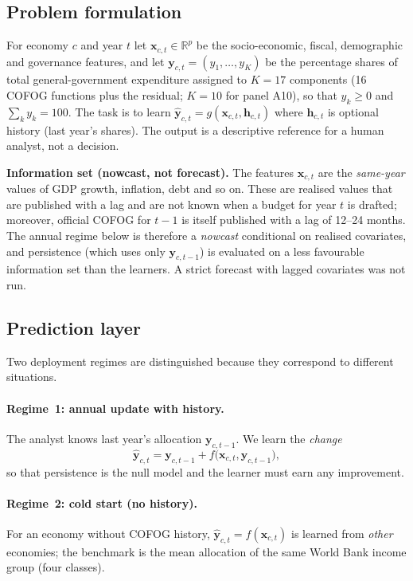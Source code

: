 \subsection{Problem formulation}
For economy $c$ and year $t$ let $\mathbf{x}_{c,t}\in\mathbb{R}^{p}$ be the socio-economic, fiscal, demographic and governance features, and let $\mathbf{y}_{c,t}=(y_1,\dots,y_{K})$ be the percentage shares of total general-government expenditure assigned to $K=17$ components (16 COFOG functions plus the residual; $K=10$ for panel A10), so that $y_k\ge 0$ and $\sum_k y_k=100$. The task is to learn $\hat{\mathbf{y}}_{c,t}=g(\mathbf{x}_{c,t},\mathbf{h}_{c,t})$ where $\mathbf{h}_{c,t}$ is optional history (last year's shares). The output is a descriptive reference for a human analyst, not a decision.

\textbf{Information set (nowcast, not forecast).} The features $\mathbf{x}_{c,t}$ are the \emph{same-year} values of GDP growth, inflation, debt and so on. These are realised values that are published with a lag and are not known when a budget for year $t$ is drafted; moreover, official COFOG for $t-1$ is itself published with a lag of 12--24 months. The annual regime below is therefore a \emph{nowcast} conditional on realised covariates, and persistence (which uses only $\mathbf{y}_{c,t-1}$) is evaluated on a less favourable information set than the learners. A strict forecast with lagged covariates was not run.

\figArch

\subsection{Prediction layer}
Two deployment regimes are distinguished because they correspond to different situations.
\paragraph{Regime~1: annual update with history.} The analyst knows last year's allocation $\mathbf{y}_{c,t-1}$. We learn the \emph{change}
\begin{equation}
\hat{\mathbf{y}}_{c,t}=\mathbf{y}_{c,t-1}+f\big(\mathbf{x}_{c,t},\mathbf{y}_{c,t-1}\big),
\end{equation}
so that persistence is the null model and the learner must earn any improvement.
\paragraph{Regime~2: cold start (no history).} For an economy without COFOG history, $\hat{\mathbf{y}}_{c,t}=f(\mathbf{x}_{c,t})$ is learned from \emph{other} economies; the benchmark is the mean allocation of the same World Bank income group (four classes).
